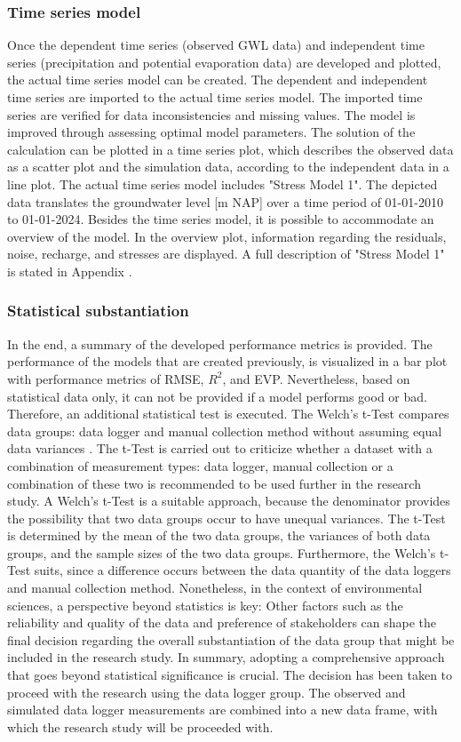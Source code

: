 \subsubsection{Time series model}
Once the dependent time series (observed GWL data) and independent time series (precipitation and potential evaporation data) are developed and plotted, the actual time series model can be created. The dependent and independent time series are imported to the actual time series model. The imported time series are verified for data inconsistencies and missing values. The model is improved through assessing optimal model parameters. The solution of the calculation can be plotted in a time series plot, which describes the observed data as a scatter plot and the simulation data, according to the independent data in a line plot. The actual time series model includes "Stress Model 1". The depicted data translates the groundwater level [m NAP] over a time period of 01-01-2010 to 01-01-2024. Besides the time series model, it is possible to accommodate an overview of the model. In the overview plot, information regarding the residuals, noise, recharge, and stresses are displayed. A full description of "Stress Model 1" is stated in Appendix .

\subsubsection{Statistical substantiation}
In the end, a summary of the developed performance metrics is provided. The performance of the models that are created previously, is visualized in a bar plot with performance metrics of RMSE, $R^2$, and EVP. Nevertheless, based on statistical data only, it can not be provided if a model performs good or bad. Therefore, an additional statistical test is executed. The Welch's t-Test compares data groups: data logger and manual collection method without assuming equal data variances \cite{ahad-2014}. The t-Test is carried out to criticize whether a dataset with a combination of measurement types: data logger, manual collection or a combination of these two is recommended to be used further in the research study. A Welch's t-Test is a suitable approach, because the denominator provides the possibility that two data groups occur to have unequal variances. The t-Test is determined by the mean of the two data groups, the variances of both data groups, and the sample sizes of the two data groups. Furthermore, the Welch's t-Test suits, since a difference occurs between the data quantity of the data loggers and manual collection method. Nonetheless, in the context of environmental sciences, a perspective beyond statistics is key: Other factors such as the reliability and quality of the data and preference of stakeholders can shape the final decision regarding the overall substantiation of the data group that might be included in the research study. In summary, adopting a comprehensive approach that goes beyond statistical significance is crucial. The decision has been taken to proceed with the research using the data logger group. The observed and simulated data logger measurements are combined into a new data frame, with which the research study will be proceeded with.

